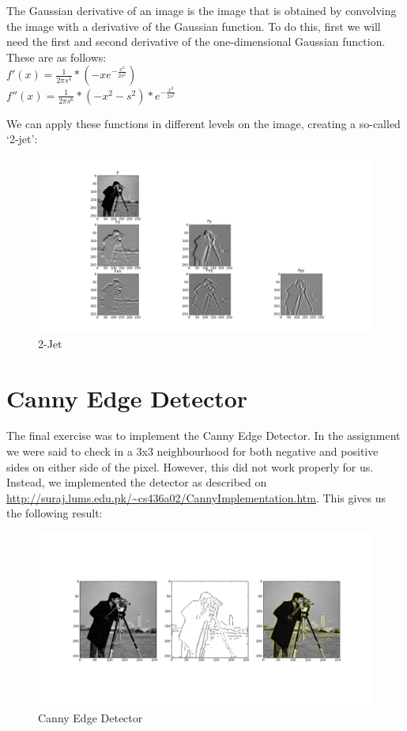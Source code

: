 \documentclass[10pt,a4paper]{article}
\begin{document}
The Gaussian derivative of an image is the image that is obtained by
convolving the image with a derivative of the Gaussian function. To do this,
first we will need the first and second derivative of the one-dimensional
Gaussian function. These are as follows:\\
$f'(x) = \frac{1}{2\pi s^4} * (-xe^{-\frac{x^2}{2s^2}})$\\
$f''(x) = \frac{1}{2\pi s^6} * (-x^2 - s^2) * e^{-\frac{x^2}{2s^2}}$

We can apply these functions in different levels on the image, creating a
so-called `2-jet':
\begin{figure}[H]
	\includegraphics[scale=0.3]{jet.png}
	\caption{2-Jet}
\end{figure}

\section{Canny Edge Detector}

The final exercise was to implement the Canny Edge Detector. In the assignment we
were said to check in a 3x3 neighbourhood for both negative and positive sides on
either side of the pixel. However, this did not work properly for us. Instead, we
implemented the detector as described on 
\url{http://suraj.lums.edu.pk/~cs436a02/CannyImplementation.htm}. This gives us the
following result:\\

\begin{figure}[H]
	\includegraphics[scale=0.3]{canny.png}
	\caption{Canny Edge Detector}
\end{figure}
\end{document}
